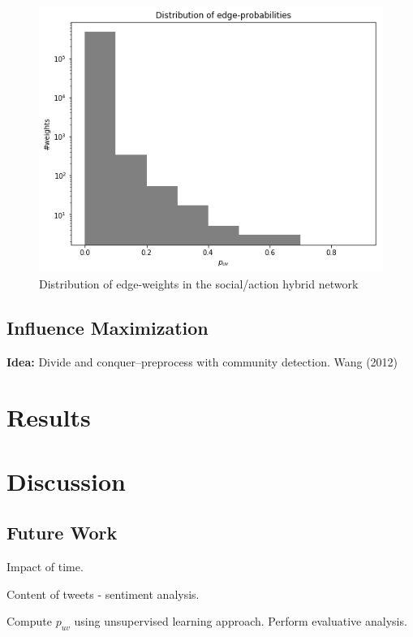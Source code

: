 \documentclass[sigconf]{acmart}
\begin{document}
\begin{figure}[htbp]
\begin{center}
\includegraphics[width=\linewidth]{Figures/puv_dist.png}
\caption{Distribution of edge-weights in the social/action hybrid network}
\label{puv_dist}
\end{center}
\end{figure}

\subsection{Influence Maximization}

\textbf{Idea:} Divide and conquer--preprocess with community detection. Wang (2012)

\section{Results} 

\section{Discussion}

\subsection{Future Work}

Impact of time. 

Content of tweets - sentiment analysis. 

Compute $p_{uv}$ using unsupervised learning approach. Perform evaluative analysis. 

\nocite{*}


\end{document}
